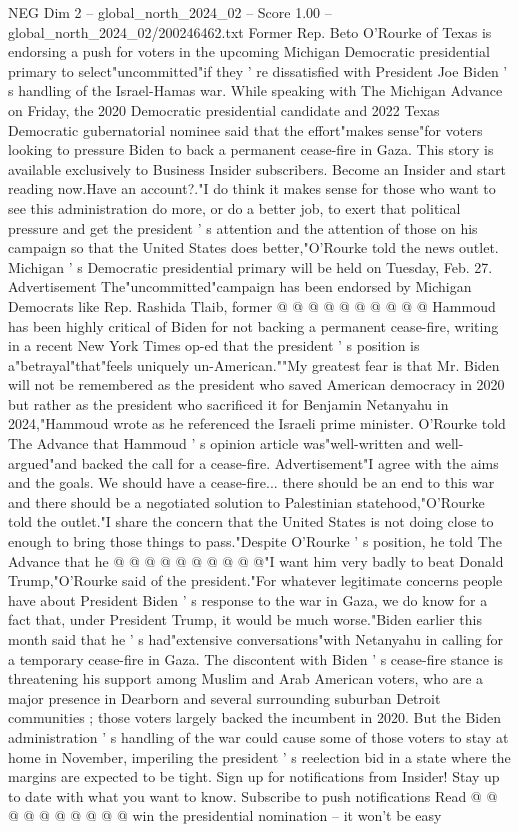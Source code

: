 \begin{textsample}{NEG Dim 2 – global\_north\_2024\_02 – Score 1.00 – global\_north\_2024\_02/200246462.txt}  \label{ex:f2_neg_305}
Former Rep.
Beto O'Rourke of Texas is endorsing a push for voters in the upcoming Michigan Democratic presidential primary to select"uncommitted"if they ' re dissatisfied with President Joe Biden ' s handling of the Israel-Hamas war.
While speaking with The Michigan Advance on Friday, the 2020 Democratic presidential candidate and 2022 Texas Democratic gubernatorial nominee said that the effort"makes sense"for voters looking to pressure Biden to back a permanent cease-fire in Gaza.
This story is available exclusively to Business Insider subscribers.
Become an Insider and start reading now.Have an account?."I do think it makes sense for those who want to see this administration do more, or do a better job, to exert that political pressure and get the president ' s attention and the attention of those on his campaign so that the United States does better,"O'Rourke told the news outlet.
Michigan ' s Democratic presidential primary will be held on Tuesday, Feb. 27.
Advertisement The"uncommitted"campaign has been endorsed by Michigan Democrats like Rep.
Rashida Tlaib, former @ @ @ @ @ @ @ @ @ @ Hammoud has been highly critical of Biden for not backing a permanent cease-fire, writing in a recent New York Times op-ed that the president ' s position is a"betrayal"that"feels uniquely un-American.""My greatest fear is that Mr.
Biden will not be remembered as the president who saved American democracy in 2020 but rather as the president who sacrificed it for Benjamin Netanyahu in 2024,"Hammoud wrote as he referenced the Israeli prime minister.
O'Rourke told The Advance that Hammoud ' s opinion article was"well-written and well-argued"and backed the call for a cease-fire.
Advertisement"I agree with the aims and the goals.
We should have a cease-fire... there should be an end to this war and there should be a negotiated solution to Palestinian statehood,"O'Rourke told the outlet."I share the concern that the United States is not doing close to enough to bring those things to pass."Despite O'Rourke ' s position, he told The Advance that he @ @ @ @ @ @ @ @ @ @"I want him very badly to beat Donald Trump,"O'Rourke said of the president."For whatever legitimate concerns people have about President Biden ' s response to the war in Gaza, we do know for a fact that, under President Trump, it would be much worse."Biden earlier this month said that he ' s had"extensive conversations"with Netanyahu in calling for a temporary cease-fire in Gaza.
The discontent with Biden ' s cease-fire stance is threatening his support among Muslim and Arab American voters, who are a major presence in Dearborn and several surrounding suburban Detroit communities ; those voters largely backed the incumbent in 2020.
But the Biden administration ' s handling of the war could cause some of those voters to stay at home in November, imperiling the president ' s reelection bid in a state where the margins are expected to be tight.
Sign up for notifications from Insider!
Stay up to date with what you want to know.
Subscribe to push notifications Read @ @ @ @ @ @ @ @ @ @ win the presidential nomination -- it won't be easy

\end{textsample}
